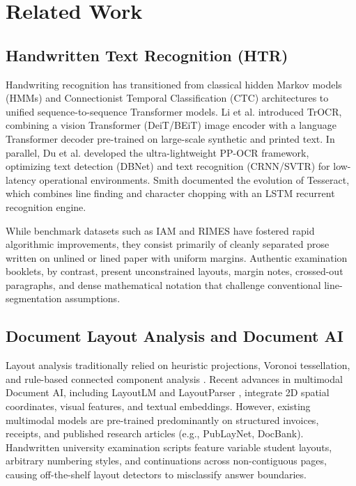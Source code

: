 \documentclass[journal]{IEEEtran}
\begin{document}
\section{Related Work}
\subsection{Handwritten Text Recognition (HTR)}
Handwriting recognition has transitioned from classical hidden Markov models (HMMs) and Connectionist Temporal Classification (CTC) architectures \cite{graves2006ctc} to unified sequence-to-sequence Transformer models. Li et al. \cite{li2023trocr} introduced TrOCR, combining a vision Transformer (DeiT/BEiT) image encoder with a language Transformer decoder pre-trained on large-scale synthetic and printed text. In parallel, Du et al. \cite{du2020ppocr} developed the ultra-lightweight PP-OCR framework, optimizing text detection (DBNet) and text recognition (CRNN/SVTR) for low-latency operational environments. Smith \cite{smith2007tesseract} documented the evolution of Tesseract, which combines line finding and character chopping with an LSTM recurrent recognition engine. 

While benchmark datasets such as IAM \cite{marti2002iam} and RIMES \cite{grosicki2009rimes} have fostered rapid algorithmic improvements, they consist primarily of cleanly separated prose written on unlined or lined paper with uniform margins. Authentic examination booklets, by contrast, present unconstrained layouts, margin notes, crossed-out paragraphs, and dense mathematical notation that challenge conventional line-segmentation assumptions.

\subsection{Document Layout Analysis and Document AI}
Layout analysis traditionally relied on heuristic projections, Voronoi tessellation, and rule-based connected component analysis \cite{binmakhashen2019survey}. Recent advances in multimodal Document AI, including LayoutLM \cite{xu2020layoutlm, huang2022layoutlmv3} and LayoutParser \cite{shen2021layoutparser}, integrate 2D spatial coordinates, visual features, and textual embeddings. However, existing multimodal models are pre-trained predominantly on structured invoices, receipts, and published research articles (e.g., PubLayNet, DocBank). Handwritten university examination scripts feature variable student layouts, arbitrary numbering styles, and continuations across non-contiguous pages, causing off-the-shelf layout detectors to misclassify answer boundaries.
\end{document}
